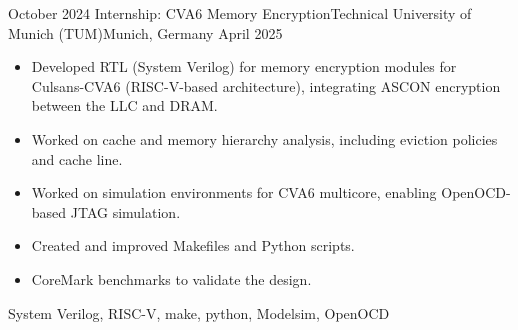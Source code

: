 \begin{experiences}
\experience
    {October 2024}   {Internship: CVA6 Memory Encryption}{Technical University of Munich (TUM)}{Munich, Germany}
    {April 2025} {
    \begin{itemize}
\item  Developed RTL (System Verilog) for memory encryption modules for Culsans-CVA6 (RISC-V-based architecture), integrating ASCON encryption between the LLC and DRAM.
\item  Worked on cache and memory hierarchy analysis, including eviction policies and cache line.
\item  Worked on simulation environments for CVA6 multicore, enabling OpenOCD-based JTAG simulation.
\item  Created and improved Makefiles and Python scripts.
\item  CoreMark benchmarks to validate the design.
    \end{itemize}
    }
    {System Verilog, RISC-V, make, python, Modelsim, OpenOCD}
  \emptySeparator





\end{experiences}
